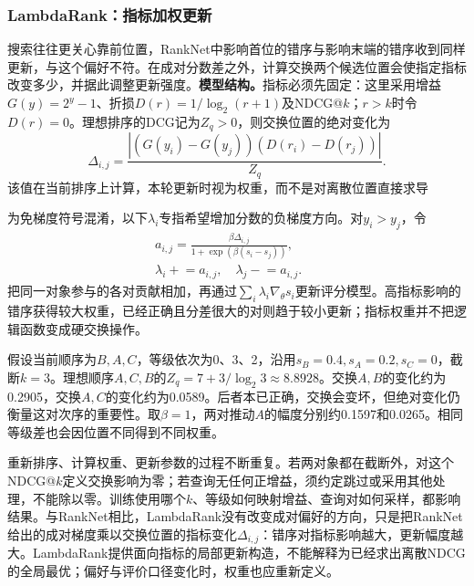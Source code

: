 \Needspace{100mm}
\subsubsection{LambdaRank：指标加权更新}
\label{sec:rs-search-lambdarank}

搜索往往更关心靠前位置，RankNet中影响首位的错序与影响末端的错序收到同样更新，与这个偏好不符。在成对分数差之外，计算交换两个候选位置会使指定指标改变多少，并据此调整更新强度。\textbf{模型结构。}指标必须先固定：这里采用增益$G(y)=2^y-1$、折损$D(r)=1/\log_2(r+1)$及NDCG@$k$；$r>k$时令$D(r)=0$。理想排序的DCG记为$Z_q>0$，则交换位置的绝对变化为
\begin{equation}
 \Delta_{i,j}=\frac{|(G(y_i)-G(y_j))(D(r_i)-D(r_j))|}{Z_q}.
 \label{eq:rs-search-lambdarank-weight}
\end{equation}
该值在当前排序上计算，本轮更新时视为权重，而不是对离散位置直接求导

为免梯度符号混淆，以下$\lambda_i$专指希望增加分数的负梯度方向。对$y_i>y_j$，令
\begin{equation}
 \begin{split}
 a_{i,j}=\frac{\beta\Delta_{i,j}}{1+\exp(\beta(s_i-s_j))},
 \qquad\\
 \lambda_i\mathrel{+}=a_{i,j},\quad
 \lambda_j\mathrel{-}=a_{i,j}.
 \end{split}
 \label{eq:rs-search-lambdarank-update}
\end{equation}
把同一对象参与的各对贡献相加，再通过$\sum_i\lambda_i\nabla_\theta s_i$更新评分模型。高指标影响的错序获得较大权重，已经正确且分差很大的对则趋于较小更新；指标权重并不把逻辑函数变成硬交换操作。

假设当前顺序为$B,A,C$，等级依次为0、3、2，沿用$s_B=0.4,s_A=0.2,s_C=0$，截断$k=3$。理想顺序$A,C,B$的$Z_q=7+3/\log_2 3\approx8.8928$。交换$A,B$的变化约为0.2905，交换$A,C$的变化约为0.0589。后者本已正确，交换会变坏，但绝对变化仍衡量这对次序的重要性。取$\beta=1$，两对推动$A$的幅度分别约0.1597和0.0265。相同等级差也会因位置不同得到不同权重。

重新排序、计算权重、更新参数的过程不断重复。若两对象都在截断外，对这个NDCG@$k$定义交换影响为零；若查询无任何正增益，须约定跳过或采用其他处理，不能除以零。训练使用哪个$k$、等级如何映射增益、查询对如何采样，都影响结果。与RankNet相比，LambdaRank没有改变成对偏好的方向，只是把RankNet给出的成对梯度乘以交换位置的指标变化$\Delta_{i,j}$：错序对指标影响越大，更新幅度越大。LambdaRank提供面向指标的局部更新构造，不能解释为已经求出离散NDCG的全局最优；偏好与评价口径变化时，权重也应重新定义。

